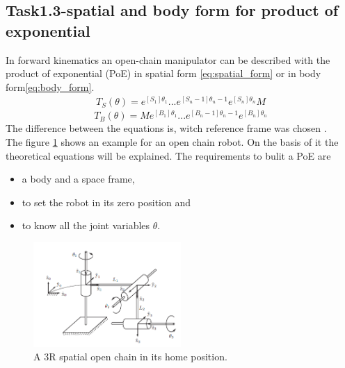 \subsection{Task1.3-spatial and body form for product of exponential}
\label{title:Task1.3}


In forward kinematics an open-chain manipulator can be described with the product of exponential (PoE) in spatial form \ref{eq:spatial_form} or in body form\ref{eq:body_form}.  
\begin{align}\label{eq:spatial_form}
    T_S(\theta) = e^{[S_1]\theta_1} ... e^{[S_n-1]\theta_n-1} e^{[S_n]\theta_n} M 
\end{align} 
\begin{equation}\label{eq:body_form}
    T_B(\theta) = M e^{[B_1]\theta_1} ... e^{[B_n-1]\theta_n-1} e^{[B_n]\theta_n}
\end{equation}
The difference between the equations is, witch reference frame was chosen .  \\
The figure \ref{fig:openchain} shows an example for an open chain robot. On the basis of it the theoretical equations will be explained. The requirements to bulit a PoE are 
\begin{itemize}
    \item a body and a space frame,
    \item to set the robot in its zero position and
    \item to know all the joint variables $\theta$.
\end{itemize}
\begin{figure}[H]
    \centering
    \includegraphics[width=0.5\textwidth]{Images/Task1.3/task1.3_openchain.PNG}
    \caption[]{A 3R spatial open chain in its home position.}
    \label{fig:openchain}
\end{figure}


